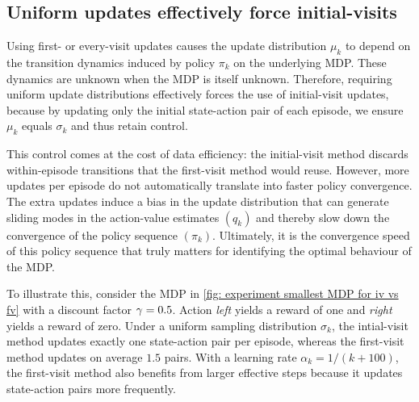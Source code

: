 
\subsection{Uniform updates effectively force initial-visits}


Using first- or every-visit updates causes the update distribution $\mu_k$ to depend on the transition dynamics induced by policy $\pi_k$ on the underlying MDP.
These dynamics are unknown when the MDP is itself unknown.
Therefore, requiring uniform update distributions effectively forces the use of initial-visit updates,
because by updating only the initial state-action pair of each episode, we ensure $\mu_k$ equals $\sigma_k$ and thus retain control.

This control comes at the cost of data efficiency: the initial-visit method discards within-episode transitions that the first-visit method would reuse. However, more updates per episode do not automatically translate into faster policy convergence.
The extra updates induce a bias in the update distribution that can generate sliding modes in the action-value estimates $(q_k)$ and thereby slow down the convergence of the policy sequence $(\pi_k)$. Ultimately, it is the convergence speed of this policy sequence that truly matters for identifying the optimal behaviour of the MDP.


To illustrate this, consider the MDP in \autoref{fig: experiment smallest MDP for iv vs fv} with a discount factor $\gamma = 0.5$. Action \textit{left} yields a reward of one and \textit{right} yields a reward of zero.
Under a uniform sampling distribution $\sigma_k$, the intial-visit method updates exactly one state-action pair per episode, whereas the first-visit method updates on average $1.5$ pairs.
With a learning rate $\alpha_k = 1/(k+100)$, the first-visit method also benefits from larger effective steps because it updates state-action pairs more frequently.


